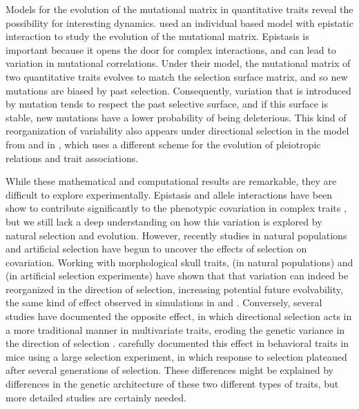 \begin{refsection}
Models for the evolution of the mutational matrix in quantitative traits
reveal the possibility for interesting dynamics. \textcite{Jones2014-wj} used an
individual based model with epistatic interaction to study the evolution
of the mutational matrix. Epistasis is important because it opens the
door for complex interactions, and can lead to variation in mutational
correlations. Under their model, the mutational matrix of two
quantitative traits evolves to match the selection surface matrix, and
so new mutations are biased by past selection. Consequently, variation
that is introduced by mutation tends to respect the past selective
surface, and if this surface is stable, new mutations have a lower
probability of being deleterious. This kind of reorganization of
variability also appears under directional selection in the model from
\textcite{Pavlicev2011-wz} and in \textcite{Draghi2008-cv}, which uses a different scheme
for the evolution of pleiotropic relations and trait associations.

While these mathematical and computational results are remarkable, they
are difficult to explore experimentally.
Epistasis and allele interactions
have been show to contribute significantly to the phenotypic covariation
in complex traits \parencite{Cheverud2004-qr, Wolf2005-nr, Wolf2006-xt, 
Pavlicev2008-jy, Huang2012-si}, but we still lack a deep
understanding on how this variation is explored by natural selection and
evolution. However, recently studies in natural populations and
artificial selection have begun to uncover the effects of selection on
covariation. Working with morphological skull traits, \textcite{Assis2016-vz} (in
natural populations) and \textcite{Penna2017-if} (in artificial selection
experiments) have shown that that variation can indeed be reorganized in
the direction of selection, increasing potential future evolvability,
the same kind of effect observed in simulations in \textcite{Pavlicev2011-wz} and
\textcite{Melo2015-bk}. Conversely, several studies have documented the opposite
effect, in which directional selection acts in a more traditional manner
in multivariate traits, eroding the genetic variance in the direction of
selection \parencite{Walsh2009-cn}. \textcite{Careau2015-sy} carefully documented this
effect in behavioral traits in mice using a large selection experiment,
in which response to selection plateaued after several generations of
selection. These differences might be explained by differences in the
genetic architecture of these two different types of traits, but more
detailed studies are certainly needed.


\end{refsection}
